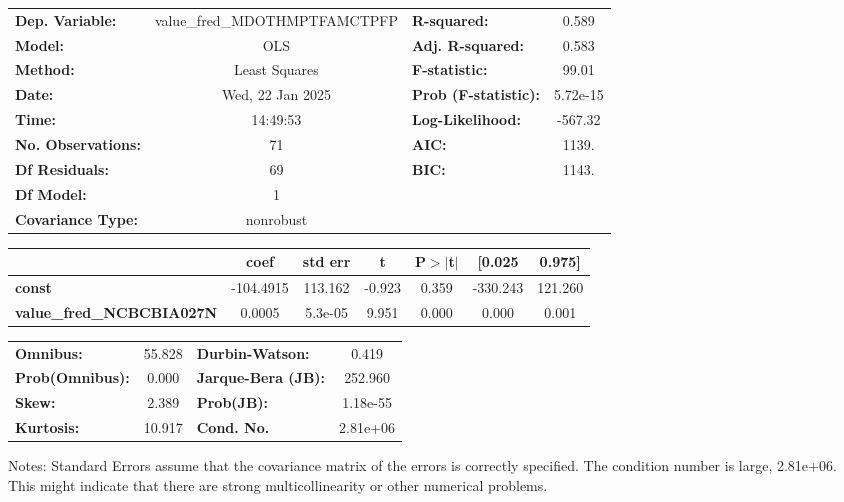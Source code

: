 \begin{center}
\begin{tabular}{lclc}
\toprule
\textbf{Dep. Variable:}           & value\_fred\_MDOTHMPTFAMCTPFP & \textbf{  R-squared:         } &     0.589   \\
\textbf{Model:}                   &              OLS              & \textbf{  Adj. R-squared:    } &     0.583   \\
\textbf{Method:}                  &         Least Squares         & \textbf{  F-statistic:       } &     99.01   \\
\textbf{Date:}                    &        Wed, 22 Jan 2025       & \textbf{  Prob (F-statistic):} &  5.72e-15   \\
\textbf{Time:}                    &            14:49:53           & \textbf{  Log-Likelihood:    } &   -567.32   \\
\textbf{No. Observations:}        &                 71            & \textbf{  AIC:               } &     1139.   \\
\textbf{Df Residuals:}            &                 69            & \textbf{  BIC:               } &     1143.   \\
\textbf{Df Model:}                &                  1            & \textbf{                     } &             \\
\textbf{Covariance Type:}         &           nonrobust           & \textbf{                     } &             \\
\bottomrule
\end{tabular}
\begin{tabular}{lcccccc}
                                  & \textbf{coef} & \textbf{std err} & \textbf{t} & \textbf{P$> |$t$|$} & \textbf{[0.025} & \textbf{0.975]}  \\
\midrule
\textbf{const}                    &    -104.4915  &      113.162     &    -0.923  &         0.359        &     -330.243    &      121.260     \\
\textbf{value\_fred\_NCBCBIA027N} &       0.0005  &      5.3e-05     &     9.951  &         0.000        &        0.000    &        0.001     \\
\bottomrule
\end{tabular}
\begin{tabular}{lclc}
\textbf{Omnibus:}       & 55.828 & \textbf{  Durbin-Watson:     } &    0.419  \\
\textbf{Prob(Omnibus):} &  0.000 & \textbf{  Jarque-Bera (JB):  } &  252.960  \\
\textbf{Skew:}          &  2.389 & \textbf{  Prob(JB):          } & 1.18e-55  \\
\textbf{Kurtosis:}      & 10.917 & \textbf{  Cond. No.          } & 2.81e+06  \\
\bottomrule
\end{tabular}
\end{center}

Notes: \newline
 [1] Standard Errors assume that the covariance matrix of the errors is correctly specified. \newline
 [2] The condition number is large, 2.81e+06. This might indicate that there are \newline
 strong multicollinearity or other numerical problems.